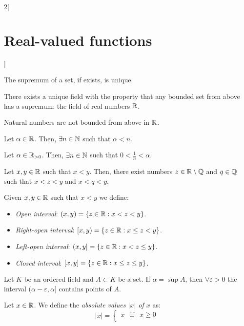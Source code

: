 \documentclass[../../../main.tex]{subfiles}
\begin{document}
\begin{multicols}{2}[\section{Real-valued functions}]
\begin{prop}
  \end{prop}
  \begin{prop}
    The supremum of a set, if exists, is unique.
  \end{prop}
  \begin{theorem}
    There exists a unique field with the property that any bounded set from above has a supremum: the field of real numbers $\mathbb{R}$.
  \end{theorem}
  \begin{prop}
    Natural numbers are not bounded from above in $\mathbb{R}$.
  \end{prop}
  \begin{corollary}
    Let $\alpha\in\mathbb{R}$. Then, $\exists n\in\mathbb{N}$ such that $\alpha<n$.
  \end{corollary}
  \begin{corollary}
    Let $\alpha\in\mathbb{R}_{>0}$. Then, $\exists n\in\mathbb{N}$ such that $0<\frac{1}{n}<\alpha$.
  \end{corollary}
  \begin{prop}
    Let $x,y\in\mathbb{R}$ such that $x<y$. Then, there exist numbers $z\in\mathbb{R}\setminus\mathbb{Q}$ and $q\in\mathbb{Q}$ such that $x<z<y$ and $x<q<y$.
  \end{prop}
  \begin{definition}
    Given $x,y\in\mathbb{R}$ such that $x<y$ we define:
    \begin{itemize}
      \item \textit{Open interval}: $(x,y)=\{z\in\mathbb{R}:x<z<y\}$.
      \item \textit{Right-open interval}: $[x,y)=\{z\in\mathbb{R}:x\leq z<y\}$.
      \item \textit{Left-open interval}: $(x,y]=\{z\in\mathbb{R}:x<z\leq y\}$.
      \item \textit{Closed interval}: $[x,y]=\{z\in\mathbb{R}:x\leq z\leq y\}$.
    \end{itemize}
  \end{definition}
  \begin{lemma}
    Let $K$ be an ordered field and $A\subset K$ be a set. If $\alpha=\sup A$, then $\forall \varepsilon>0$ the interval $(\alpha-\varepsilon,\alpha]$ contains points of $A$.
  \end{lemma}
  \begin{definition}
    Let $x\in\mathbb{R}$. We define the \textit{absolute values $|x|$ of $x$} as:
    \begin{equation*}
      |x|=\left\{
      \begin{array}{ccc}
        x  & \text{if} & x\geq 0 \\

\end{array}
\end{equation*}
\end{definition}
\end{multicols}
\end{document}
